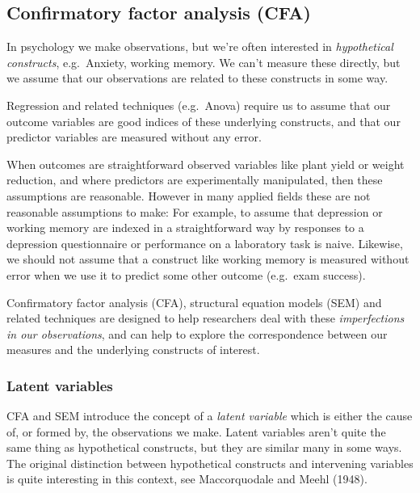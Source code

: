 \documentclass[]{article}
\begin{document}
\hypertarget{cfa}{%
\subsection*{Confirmatory factor analysis (CFA)}\label{cfa}}

In psychology we make observations, but we're often interested in \emph{hypothetical
constructs}, e.g.~Anxiety, working memory. We can't measure these directly, but
we assume that our observations are related to these constructs in some way.

Regression and related techniques (e.g.~Anova) require us to assume that our
outcome variables are good indices of these underlying constructs, and that our
predictor variables are measured without any error.

When outcomes are straightforward observed variables like plant yield or weight
reduction, and where predictors are experimentally manipulated, then these
assumptions are reasonable. However in many applied fields these are not
reasonable assumptions to make: For example, to assume that depression or
working memory are indexed in a straightforward way by responses to a depression
questionnaire or performance on a laboratory task is naive. Likewise, we should
not assume that a construct like working memory is measured without error when
we use it to predict some other outcome (e.g.~exam success).

Confirmatory factor analysis (CFA), structural equation models (SEM) and related
techniques are designed to help researchers deal with these \emph{imperfections in
our observations}, and can help to explore the correspondence between our
measures and the underlying constructs of interest.

\hypertarget{latent-variables}{%
\subsubsection*{Latent variables}\label{latent-variables}}

CFA and SEM introduce the concept of a \emph{latent variable} which is either the
cause of, or formed by, the observations we make. Latent variables aren't quite
the same thing as hypothetical constructs, but they are similar many in some
ways. The original distinction between hypothetical constructs and intervening
variables is quite interesting in this context, see Maccorquodale and Meehl
(1948).
\end{document}
